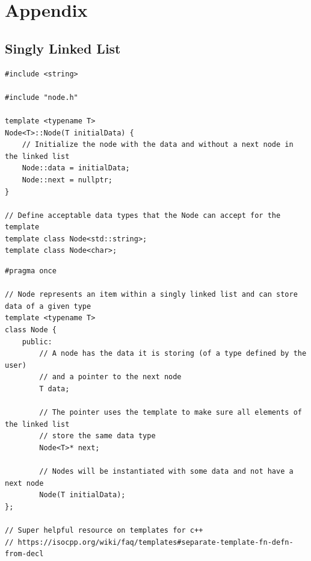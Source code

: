 \documentclass[letterpaper, 10pt,DIV=13]{scrartcl}
\numberwithin{equation}{section} %
\numberwithin{figure}{section} %
\numberwithin{table}{section} %
\begin{document}


\section{Appendix}
\lstset{numbers=left, numberstyle=\tiny, stepnumber=1, numbersep=5pt, basicstyle=\footnotesize\ttfamily}

\subsection{Singly Linked List}\label{nodeListing}
\begin{lstlisting}[frame=single, ]  
#include <string>

#include "node.h"

template <typename T>
Node<T>::Node(T initialData) {
    // Initialize the node with the data and without a next node in the linked list
    Node::data = initialData;
    Node::next = nullptr;
}

// Define acceptable data types that the Node can accept for the template
template class Node<std::string>;
template class Node<char>;
\end{lstlisting}

\begin{lstlisting}[frame=single, ]  
#pragma once

// Node represents an item within a singly linked list and can store data of a given type
template <typename T>
class Node {
    public:
        // A node has the data it is storing (of a type defined by the user)
        // and a pointer to the next node
        T data;

        // The pointer uses the template to make sure all elements of the linked list
        // store the same data type
        Node<T>* next;

        // Nodes will be instantiated with some data and not have a next node
        Node(T initialData);
};

// Super helpful resource on templates for c++
// https://isocpp.org/wiki/faq/templates#separate-template-fn-defn-from-decl
\end{lstlisting}
\end{document}

